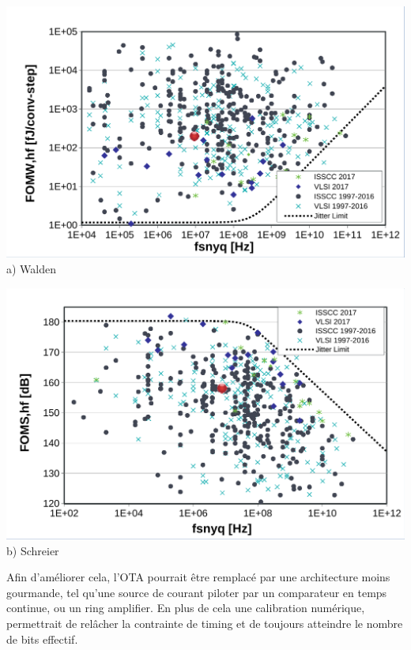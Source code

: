 \begin{mdframed}[linecolor=Prune,linewidth=1]
\begin{center}
    \centering
    \begin{minipage}[b]{0.49\linewidth}
        \centering
        \includegraphics[width=\textwidth]{Abstract/Figs/WaldenFoM-a.pdf}
        a) Walden
    \end{minipage}
    \begin{minipage}[b]{0.49\linewidth}
        \centering
        \includegraphics[width=\textwidth]{Abstract/Figs/SchreierFoM-a.pdf}
        b) Schreier
    \end{minipage}
	\label{fig:fom-fr}
\end{center}

Afin d'améliorer cela, l'OTA pourrait être remplacé par une architecture moins gourmande, tel qu'une source de courant piloter par un comparateur en temps continue, ou un ring amplifier. En plus de cela une calibration numérique, permettrait de relâcher la contrainte de timing et de toujours atteindre le nombre de bits effectif.

\end{mdframed}

